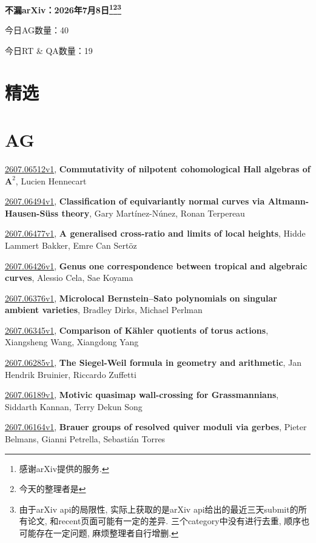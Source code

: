 \documentclass[9pt, a4paper]{article}
\theoremstyle{plain}
\theoremstyle{definition}
\theoremstyle{remark}
\newcommand{\arxiv}[3]{\href{https://arxiv.org/abs/#1}{#1}, \textbf{\textcolor{arxivblue}{#2}}, #3}
\newcommand{\AGnumber}{40}
\newcommand{\RTQAnumber}{19}
\newcommand{\NewestDate}{2026年7月8日}
\newcommand{\todayarXiver}{} %
\begin{document}
\begin{center}
    \Huge\textbf{不漏arXiv：\NewestDate\footnote{感谢arXiv提供的服务.}\footnote{今天的整理者是\todayarXiver}\footnote{由于arXiv api的局限性, 实际上获取的是arXiv api给出的最近三天submit的所有论文, 和recent页面可能有一定的差异. 三个category中没有进行去重, 顺序也可能存在一定问题, 麻烦整理者自行增删.}} \\
\end{center}

\setcounter{section}{-1}

\begin{center}
    今日AG数量：\AGnumber
    
    今日RT \& QA数量：\RTQAnumber
    
\end{center}


\section{精选}


\section{AG}
\arxiv{2607.06512v1}{Commutativity of nilpotent cohomological Hall algebras of $\mathbf{A}^2$}{Lucien Hennecart}

\arxiv{2607.06494v1}{Classification of equivariantly normal curves via Altmann-Hausen-Süss theory}{Gary Martínez-Núnez, Ronan Terpereau}

\arxiv{2607.06477v1}{A generalised cross-ratio and limits of local heights}{Hidde Lammert Bakker, Emre Can Sertöz}

\arxiv{2607.06426v1}{Genus one correspondence between tropical and algebraic curves}{Alessio Cela, Sae Koyama}

\arxiv{2607.06376v1}{Microlocal Bernstein--Sato polynomials on singular ambient varieties}{Bradley Dirks, Michael Perlman}

\arxiv{2607.06345v1}{Comparison of Kähler quotients of torus actions}{Xiangsheng Wang, Xiangdong Yang}

\arxiv{2607.06285v1}{The Siegel-Weil formula in geometry and arithmetic}{Jan Hendrik Bruinier, Riccardo Zuffetti}

\arxiv{2607.06189v1}{Motivic quasimap wall-crossing for Grassmannians}{Siddarth Kannan, Terry Dekun Song}

\arxiv{2607.06164v1}{Brauer groups of resolved quiver moduli via gerbes}{Pieter Belmans, Gianni Petrella, Sebastián Torres}
\end{document}
